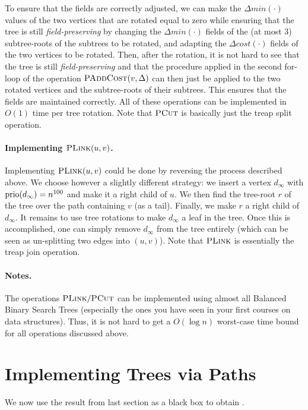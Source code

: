 To ensure that the fields are correctly adjusted, we can make the $\Delta min(\cdot)$ values of the two vertices that are rotated equal to zero while ensuring that the tree is still \emph{field-preserving} by changing the $\Delta min(\cdot)$ fields of the (at most 3) subtree-roots of the subtrees to be rotated, and adapting the $\Delta cost(\cdot)$ fields of the two vertices to be rotated. Then, after the rotation, it is not hard to see that the tree is still \emph{field-preserving} and that the procedure applied in the second for-loop of the operation $\textsc{PAddCost}(v, \Delta)$ can then just be applied to the two rotated vertices and the subtree-roots of their subtrees. This ensures that the fields are maintained correctly. All of these operations can be implemented in $O(1)$ time per tree rotation.
Note that  $\textsc{PCut}$ is basically just the treap split operation.

\paragraph{Implementing $\textsc{PLink}(u,v)$.} Implementing $\textsc{PLink}(u,v)$ could be done by reversing the process described above. We choose however a slightly different strategy: we insert a vertex $d_{\infty}$ with $\operatorname{prio}(d_{\infty}) = n^{100}$ and make it a right child of $u$. We then find the tree-root $r$ of the tree over the path containing $v$ (as a tail). Finally, we make $r$ a right child of $d_{\infty}$. It remains to use tree rotations to make $d_{\infty}$ a leaf in the tree.  Once this is accomplished, one can simply remove $d_{\infty}$ from the tree entirely (which can be seen as un-splitting two edges into $(u,v)$).
Note that  $\textsc{PLink}$ is essentially the treap join operation.

\paragraph{Notes.} The operations $\textsc{PLink}/ \textsc{PCut}$ can be implemented using almost all Balanced Binary Search Trees (especially the ones you have seen in your first courses on data structures). Thus, it is not hard to get a $O(\log n)$ worst-case time bound for all operations discussed above.

\section{Implementing Trees via Paths}

We now use the result from last section as a black box to obtain .

